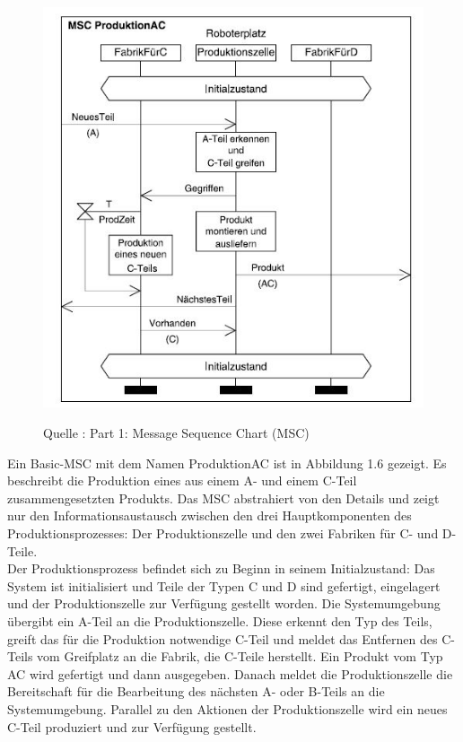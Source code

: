 \begin{center}
\begin{figure}[h]
   

\includegraphics[scale=1]{Graphics/MSC1.jpg}



Quelle : \cite{MT009}
Part 1: Message Sequence Chart (MSC) 

 
\label{fig7}


\end{figure}

\end{center}
\newpage
Ein Basic-MSC mit dem Namen ProduktionAC ist in
Abbildung 1.6 gezeigt. Es beschreibt die Produktion eines aus einem
A- und einem C-Teil zusammengesetzten Produkts.
Das MSC abstrahiert von den Details und zeigt nur den Informationsaustausch
zwischen den drei Hauptkomponenten
des Produktionsprozesses: Der Produktionszelle und den
zwei Fabriken für C- und D-Teile.
\\
Der Produktionsprozess befindet sich zu Beginn in seinem
Initialzustand: Das System ist initialisiert und Teile
der Typen C und D sind gefertigt, eingelagert und der
Produktionszelle zur Verfügung gestellt worden. Die Systemumgebung
übergibt ein A-Teil an die Produktionszelle.
Diese erkennt den Typ des Teils, greift das für die Produktion
notwendige C-Teil und meldet das Entfernen des
C-Teils vom Greifplatz an die Fabrik, die C-Teile herstellt.
Ein Produkt vom Typ AC wird gefertigt und dann
ausgegeben. Danach meldet die Produktionszelle die Bereitschaft
für die Bearbeitung des nächsten A- oder B-Teils
an die Systemumgebung. Parallel zu den Aktionen der Produktionszelle
wird ein neues C-Teil produziert und zur
Verfügung gestellt.\cite{MT009} \\
